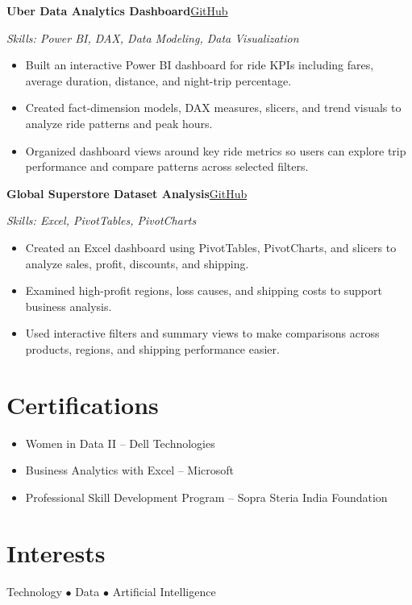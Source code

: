 \documentclass[a4paper,10pt]{article}
\newcommand{\subtext}[1]{\textit{#1}\par\vspace{0.02cm}}
\newcommand{\projecttitle}[2]{\noindent\textbf{#1}\hfill{\small\color{UI_blue}\href{#2}{GitHub}}\par\vspace{1pt}}
\newenvironment{zitemize}{\begin{itemize}}{\end{itemize}\vspace{0.02cm}}
\begin{document}
\projecttitle{Uber Data Analytics Dashboard}{https://github.com/Kalpanabharti/Uber_Data_Analytics}
\subtext{Skills: Power BI, DAX, Data Modeling, Data Visualization}
\begin{zitemize}
    \item Built an interactive Power BI dashboard for ride KPIs including fares, average duration, distance, and night-trip percentage.
    \item Created fact-dimension models, DAX measures, slicers, and trend visuals to analyze ride patterns and peak hours.
    \item Organized dashboard views around key ride metrics so users can explore trip performance and compare patterns across selected filters.
\end{zitemize}

\projecttitle{Global Superstore Dataset Analysis}{https://github.com/KalpanaBharti/MyStore-Data-Analysis}
\subtext{Skills: Excel, PivotTables, PivotCharts}
\begin{zitemize}
    \item Created an Excel dashboard using PivotTables, PivotCharts, and slicers to analyze sales, profit, discounts, and shipping.
    \item Examined high-profit regions, loss causes, and shipping costs to support business analysis.
    \item Used interactive filters and summary views to make comparisons across products, regions, and shipping performance easier.
\end{zitemize}

\section{Certifications}
\begin{zitemize}
    \item Women in Data II -- Dell Technologies
    \item Business Analytics with Excel -- Microsoft
    \item Professional Skill Development Program -- Sopra Steria India Foundation
\end{zitemize}

\section{Interests}
Technology \quad $\bullet$ \quad Data \quad $\bullet$ \quad Artificial Intelligence
\end{document}
